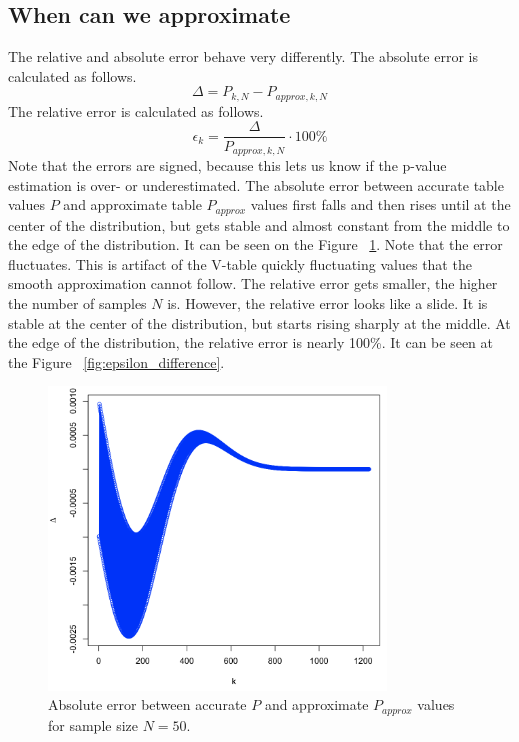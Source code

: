 \documentclass[12pt]{article}
\begin{document}
{\subsection{When can we approximate}
The relative and absolute error behave very differently. The absolute error is calculated as follows.
\begin{equation}
  \Delta = P_{k, N} - P_{approx, k, N}
\end{equation}
The relative error is calculated as follows.
\begin{equation}\label{eq:relative_error}
  \epsilon_k = \frac{\Delta}{P_{approx, k, N}} \cdot 100\%
\end{equation}
Note that the errors are signed, because this lets us know if the p-value estimation is over- or underestimated.
The absolute error between accurate table values $P$ and approximate table $P_{approx}$ values first falls and then rises until at the center of the distribution, but gets stable and almost constant from the middle to the edge of the distribution. It can be seen on the Figure ~\ref{fig:absolute_difference}. Note that the error fluctuates. This is artifact of the V-table quickly fluctuating values that the smooth approximation cannot follow. The relative error gets smaller, the higher the number of samples $N$ is. However, the relative error looks like a slide. It is stable at the center of the distribution, but starts rising sharply at the middle. At the edge of the distribution, the relative error is nearly 100\%. It can be seen at the Figure ~\ref{fig:epsilon_difference}.

\begin{figure}[!t]
  \centering
  \includegraphics[width=0.8\textwidth]{approximate_accurate_difference}
  \caption{Absolute error between accurate $P$ and approximate $P_{approx}$ values for sample size $N=50$.}
  \label{fig:absolute_difference}
\end{figure}

}
\end{document}
